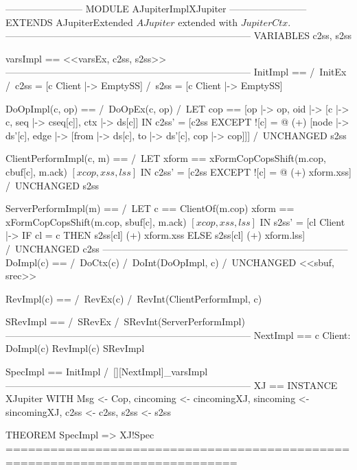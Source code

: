 \documentclass{article}
\begin{document}
\begin{tla}
------------------------ MODULE AJupiterImplXJupiter ------------------------
EXTENDS AJupiterExtended \* $AJupiter$ extended with $JupiterCtx$.
-----------------------------------------------------------------------------
VARIABLES c2ss, s2ss

varsImpl == <<varsEx, c2ss, s2ss>>
-----------------------------------------------------------------------------
InitImpl ==
    /\ InitEx
    /\ c2ss = [c \in Client |-> EmptySS]    
    /\ s2ss = [c \in Client |-> EmptySS]    

DoOpImpl(c, op) == 
    /\ DoOpEx(c, op)
    /\ LET cop == [op |-> op, oid |-> [c |-> c, seq |-> cseq[c]], ctx |-> ds[c]] 
       IN  c2ss' = [c2ss EXCEPT ![c] = 
                        @ (+) [node |-> {ds'[c]},
                               edge |-> {[from |-> ds[c], to |-> ds'[c], cop |-> cop]}]]
    /\ UNCHANGED s2ss

ClientPerformImpl(c, m) ==
    /\ LET xform == xFormCopCopsShift(m.cop, cbuf[c], m.ack) \* $[xcop, xss, lss]$
       IN  c2ss' = [c2ss EXCEPT ![c] = @ (+) xform.xss]
    /\ UNCHANGED s2ss

ServerPerformImpl(m) ==
    /\ LET c == ClientOf(m.cop)
           xform == xFormCopCopsShift(m.cop, sbuf[c], m.ack) \* $[xcop, xss, lss]$
       IN  s2ss' = [cl \in Client |-> IF cl = c THEN s2ss[cl] (+) xform.xss 
                                                ELSE s2ss[cl] (+) xform.lss]
    /\ UNCHANGED c2ss
-----------------------------------------------------------------------------
DoImpl(c) == 
    /\ DoCtx(c)
    /\ DoInt(DoOpImpl, c)
    /\ UNCHANGED <<sbuf, srec>>

RevImpl(c) ==
    /\ RevEx(c)
    /\ RevInt(ClientPerformImpl, c)

SRevImpl ==
    /\ SRevEx
    /\ SRevInt(ServerPerformImpl)
-----------------------------------------------------------------------------
NextImpl ==
    \/ \E c \in Client: DoImpl(c) \/ RevImpl(c)
    \/ SRevImpl

SpecImpl == InitImpl /\ [][NextImpl]_varsImpl
-----------------------------------------------------------------------------
XJ == INSTANCE XJupiter WITH Msg <- Cop,
         cincoming <- cincomingXJ, sincoming <- sincomingXJ,
         c2ss <- c2ss, s2ss <- s2ss

THEOREM SpecImpl => XJ!Spec
=============================================================================
\end{tla}
\end{document}
